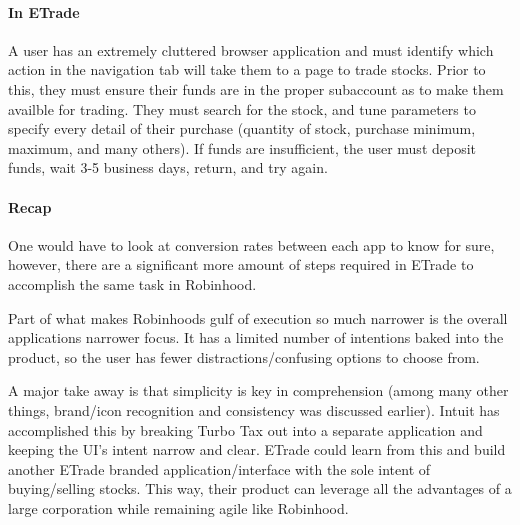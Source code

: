 \paragraph{In ETrade}
A user has an extremely cluttered browser application and must identify which action in the navigation tab will take them to a page to trade stocks. Prior to this, they must ensure their funds are in the proper subaccount as to make them availble for trading. They must search for the stock, and tune parameters to specify every detail of their purchase (quantity of stock, purchase minimum, maximum, and many others). If funds are insufficient, the user must deposit funds, wait 3-5 business days, return, and try again.

\paragraph{Recap}
One would have to look at conversion rates between each app to know for sure, however, there are a significant more amount of steps required in ETrade to accomplish the same task in Robinhood.

Part of what makes Robinhoods gulf of execution so much narrower is the overall applications narrower focus. It has a limited number of intentions baked into the product, so the user has fewer distractions/confusing options to choose from.

A major take away is that simplicity is key in comprehension (among many other things, brand/icon recognition and consistency was discussed earlier). Intuit has accomplished this by breaking Turbo Tax out into a separate application and keeping the UI's intent narrow and clear. ETrade could learn from this and build another ETrade branded application/interface with the sole intent of buying/selling stocks. This way, their product can leverage all the advantages of a large corporation while remaining agile like Robinhood.


